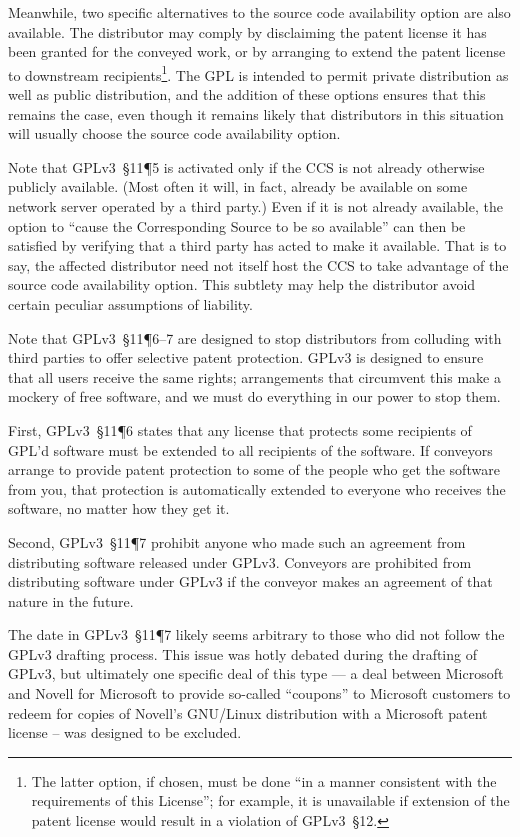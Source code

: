 Meanwhile, two specific alternatives to the source code availability option
are also available. The distributor may comply by disclaiming the patent
license it has been granted for the conveyed work, or by arranging to extend
the patent license to downstream recipients\footnote{The latter option, if
  chosen, must be done ``in a manner consistent with the requirements of this
  License''; for example, it is unavailable if extension of the patent
  license would result in a violation of GPLv3~\S 12.}.  The GPL is intended
to permit private distribution as well as public distribution, and the
addition of these options ensures that this remains the case, even though it
remains likely that distributors in this situation will usually choose the
source code availability option.

Note that GPLv3~\S11\P5 is activated only if the CCS is not already otherwise
publicly available.  (Most often it will, in fact, already be available on
some network server operated by a third party.)  Even if it is not already
available, the option to ``cause the Corresponding Source to be so
available'' can then be satisfied by verifying that a third party has acted
to make it available.  That is to say, the affected distributor need not
itself host the CCS to take advantage of the source code availability option.
This subtlety may help the distributor avoid certain peculiar assumptions of
liability.

Note that GPLv3~\S11\P6--7 are designed to stop distributors from colluding with
third parties to offer selective patent protection.  GPLv3 is designed to
ensure that all users receive the same rights; arrangements that circumvent
this make a mockery of free software, and we must do everything in our power
to stop them.

First, GPLv3~\S11\P6 states that any license that protects some recipients of
GPL'd software must be extended to all recipients of the software.  
If conveyors arrange to provide patent
protection to some of the people who get the software from you, that
protection is automatically extended to everyone who receives the software,
no matter how they get it. 

Second, GPLv3~\S11\P7
prohibit anyone who made such an agreement from distributing software
released under GPLv3.    Conveyors are prohibited from
distributing software under GPLv3 if the conveyor makes an agreement of that
nature in the future.

The date in GPLv3~\S11\P7 likely seems arbitrary to those who did not follow
the GPLv3 drafting process.  This issue was hotly debated during the drafting of
GPLv3, but ultimately one specific deal of this type --- a deal between Microsoft
and Novell for Microsoft to provide so-called ``coupons'' to Microsoft customers to redeem
for copies of Novell's GNU/Linux distribution with a Microsoft patent license -- was
designed to be excluded.

